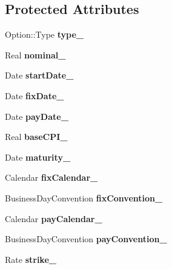 \subsection*{Protected Attributes}
\begin{DoxyCompactItemize}
\item 
Option\+::\+Type {\bfseries type\+\_\+}\label{class_quant_lib_1_1_c_p_i_cap_floor_aaab8e746ce61936f9fbed3d0a2ca1bde}

\item 
Real {\bfseries nominal\+\_\+}\label{class_quant_lib_1_1_c_p_i_cap_floor_a657589cc0a3846ab5ddab20db928a035}

\item 
Date {\bfseries start\+Date\+\_\+}\label{class_quant_lib_1_1_c_p_i_cap_floor_a009fae9b274dc8fc2ccadf5ed2596fb3}

\item 
Date {\bfseries fix\+Date\+\_\+}\label{class_quant_lib_1_1_c_p_i_cap_floor_ab82fe0f12fcbe73f845fd026188a9d44}

\item 
Date {\bfseries pay\+Date\+\_\+}\label{class_quant_lib_1_1_c_p_i_cap_floor_aeb735b60014d713dc4891440cc754a29}

\item 
Real {\bfseries base\+C\+P\+I\+\_\+}\label{class_quant_lib_1_1_c_p_i_cap_floor_a7a512eb1408ef6a255824e4b702360b1}

\item 
Date {\bfseries maturity\+\_\+}\label{class_quant_lib_1_1_c_p_i_cap_floor_a952ae623033c60e96581f1573f2133b5}

\item 
Calendar {\bfseries fix\+Calendar\+\_\+}\label{class_quant_lib_1_1_c_p_i_cap_floor_a4f53ffe45a886b2ce6421aeb82dcabff}

\item 
Business\+Day\+Convention {\bfseries fix\+Convention\+\_\+}\label{class_quant_lib_1_1_c_p_i_cap_floor_ad4e736ab1a8f8040cca457666c5de739}

\item 
Calendar {\bfseries pay\+Calendar\+\_\+}\label{class_quant_lib_1_1_c_p_i_cap_floor_a43f143c4459ad63d3df36e974bf2bb3b}

\item 
Business\+Day\+Convention {\bfseries pay\+Convention\+\_\+}\label{class_quant_lib_1_1_c_p_i_cap_floor_ad06a28dc5289291146934b5739557178}

\item 
Rate {\bfseries strike\+\_\+}\label{class_quant_lib_1_1_c_p_i_cap_floor_ad9546706297b71ffe432ea7725255d4c}


\end{DoxyCompactItemize}
